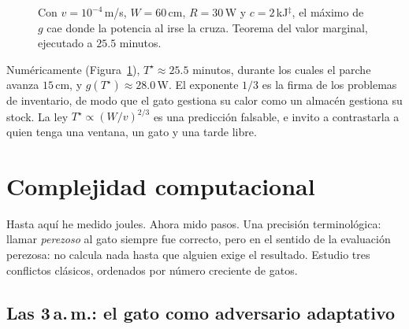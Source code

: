 \documentclass[11pt,a4paper]{article}
\theoremstyle{plain}
\theoremstyle{definition}
\theoremstyle{remark}
\numberwithin{equation}{section}
\newcommand{\calib}{{\ensuremath{^{\ddagger}}}}
\begin{document}
\begin{figure}[ht]
\centering
{}
\caption{Con $v=10^{-4}$\,m/s, $W=60$\,cm, $R=30$\,W y $c=2$\,kJ\calib, el máximo de $g$ cae donde la potencia al irse la cruza. Teorema del valor marginal, ejecutado a $25.5$ minutos.}\label{fig:sol}
\end{figure}

Numéricamente (Figura~\ref{fig:sol}), $T^\star\approx 25.5$ minutos, durante los cuales el parche avanza $15$\,cm, y $g(T^\star)\approx 28.0$\,W. El exponente $1/3$ es la firma de los problemas de inventario, de modo que el gato gestiona su calor como un almacén gestiona su stock. La ley $T^\star\propto (W/v)^{2/3}$ es una predicción falsable, e invito a contrastarla a quien tenga una ventana, un gato y una tarde libre.

\section{Complejidad computacional}\label{sec:computacional}

Hasta aquí he medido joules. Ahora mido pasos. Una precisión terminológica: llamar \emph{perezoso} al gato siempre fue correcto, pero en el sentido de la evaluación perezosa: no calcula nada hasta que alguien exige el resultado. Estudio tres conflictos clásicos, ordenados por número creciente de gatos.

\subsection{Las 3\,a.\,m.: el gato como adversario adaptativo}
\end{document}
